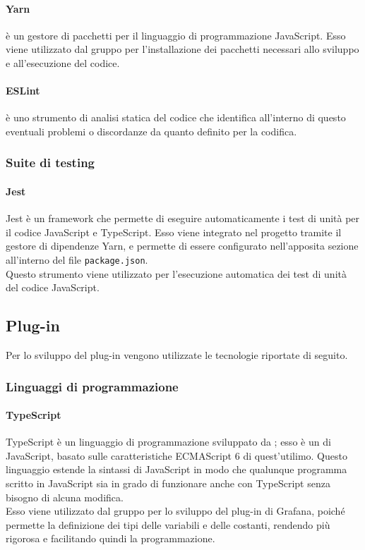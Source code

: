 \documentclass[../manuale-sviluppatore.tex]{subfiles}
\begin{document}
\paragraph{Yarn}
 è un gestore di pacchetti per il linguaggio di programmazione JavaScript. Esso viene utilizzato dal gruppo per l'installazione dei pacchetti necessari allo sviluppo e all'esecuzione del codice.

\paragraph{ESLint}
 è uno strumento di analisi statica del codice che identifica all'interno di questo eventuali problemi o discordanze da quanto definito per la codifica.

\subsubsection{Suite di testing}
\paragraph{Jest}
Jest è un framework che permette di eseguire automaticamente i test di unità per il codice JavaScript e TypeScript. Esso viene integrato nel progetto tramite il gestore di dipendenze Yarn, e permette di essere configurato nell'apposita sezione all'interno del file \texttt{package.json}. \\
Questo strumento viene utilizzato per l'esecuzione automatica dei test di unità del codice JavaScript.

\subsection{Plug-in}%
\label{subsc:plug_in}
Per lo sviluppo del plug-in vengono utilizzate le tecnologie riportate di seguito.
\subsubsection{Linguaggi di programmazione}
\paragraph{TypeScript}
TypeScript è un linguaggio di programmazione sviluppato da ; esso è un  di JavaScript, basato sulle caratteristiche ECMAScript 6 di quest'utilimo. Questo linguaggio estende la sintassi di JavaScript in modo che qualunque programma scritto in JavaScript sia in grado di funzionare anche con TypeScript senza bisogno di alcuna modifica. \\
Esso viene utilizzato dal gruppo per lo sviluppo del plug-in di Grafana, poiché permette la definizione dei tipi delle variabili e delle costanti, rendendo più rigorosa e facilitando quindi la programmazione.
\end{document}
